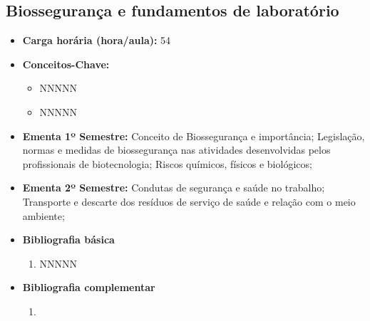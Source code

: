 \documentclass[11pt,fleqn]{book} %
\begin{document}
\subsection{Biossegurança e fundamentos de laboratório}\label{disc:bioseg}
\begin{itemize}
	\item \textbf{Carga horária (hora/aula):} 54
	\item \textbf{Conceitos-Chave:}
	\begin{itemize}
		\item NNNNN
		\item NNNNN
	\end{itemize}
	\item \textbf{Ementa 1º Semestre:} 
	Conceito de Biossegurança e importância; 
	Legislação, normas e medidas de biossegurança nas atividades desenvolvidas pelos profissionais de biotecnologia; 
	Riscos químicos, físicos e biológicos; 
	\item \textbf{Ementa 2º Semestre:} 
	Condutas de segurança e saúde no trabalho; 
	Transporte e descarte dos resíduos de serviço de saúde e relação com o meio ambiente;
	\item \textbf{Bibliografia básica}
	\begin{enumerate}
		\item NNNNN
	\end{enumerate}
	\item \textbf{Bibliografia complementar}
	\begin{enumerate}
		\item 
	\end{enumerate}	
\end{itemize}

\newpage
\end{document}
